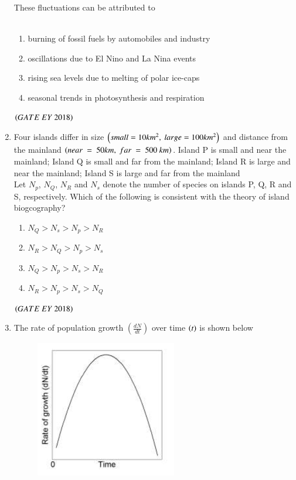 \documentclass[journal]{IEEEtran}
\numberwithin{equation}{enumi}
\numberwithin{figure}{enumi}
\begin{document}
\begin{enumerate}
\begin{figure}[!ht]
    \caption{}
    \label{fig:10}
   \end{figure}
   These fluctuations can be attributed to\\
   \\
    \begin{enumerate}
        \item burning of fossil fuels by automobiles and industry
        \item oscillations due to El Nino and La Nina events
        \item rising sea levels due to melting of polar ice-caps
        \item seasonal trends in photosynthesis and respiration
    \end{enumerate}
    \hfill{$\brak{ GATE\ EY\ 2018}$}
    \bigskip
\item Four islands differ in size $\left(small = 10 km^2,\ large = 100 km^2\right)$ and distance from the
mainland $\brak{near\ =\ 50 km,\ far\ =\ 500\ km}$.
Island P is small and near the mainland;
Island Q is small and far from the mainland;
Island R is large and near the mainland;
Island S is large and far from the mainland
\\
Let $N_p$, $N_Q$, $N_R$ and $N_s$ denote the number of species on islands P, Q, R and S,
respectively. Which of the following is consistent with the theory of island
biogcography?
\begin{multicols}{2}
    \begin{enumerate}
        \item $N_Q>N_s > N_p> N_R$
        \item $N_R>N_Q>N_p>N_s$
        \item $N_Q>N_p>N_s>N_R$
        \item $N_R> N_p > N_s > N_Q$
    \end{enumerate}
    \end{multicols}
    \hfill{$\brak{ GATE\ EY\ 2018}$}
    \bigskip
\item The rate of population growth $(\frac{dN}{dt})$ over time $\left(t\right)$ is shown below
\begin{figure}[!ht]
    \centering
    \includegraphics[width=0.3\columnwidth]{figs/11.png}

\end{figure}
\end{enumerate}
\end{document}
